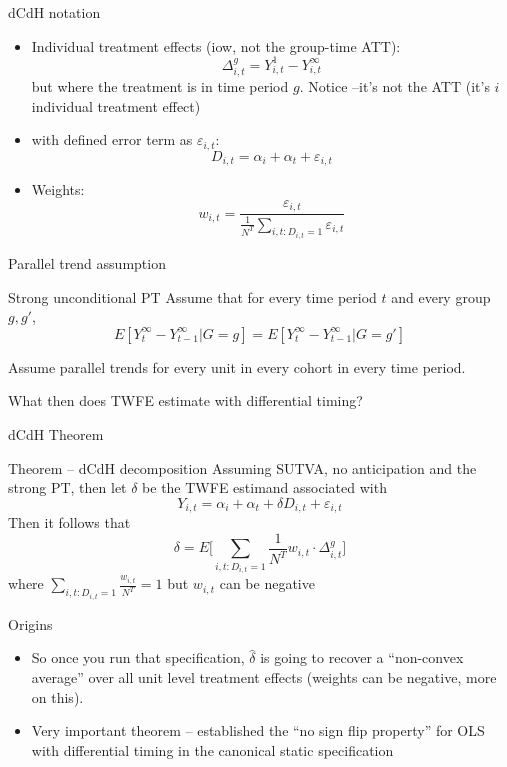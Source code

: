 \documentclass{beamer}
\begin{document}
\begin{frame}{dCdH notation}

\begin{itemize}
\item Individual treatment effects (iow, not the group-time ATT): $$\Delta^g_{i,t} = Y^1_{i,t} - Y^\infty_{i,t}$$ but where the treatment is in time period $g$. Notice --it's not the ATT (it's $i$ individual treatment effect)
\item with defined error term as $\varepsilon_{i,t}$: $$D_{i,t} = \alpha_i + \alpha_t + \varepsilon_{i,t}$$
\item Weights: $$w_{i,t} = \frac{\varepsilon_{i,t}}{\frac{1}{N^T} \sum_{i,t:D_{i,t}=1} \varepsilon_{i,t}}$$
\end{itemize}

\end{frame}

\begin{frame}{Parallel trend assumption}

\begin{block}{Strong unconditional PT}
Assume that for every time period $t$ and every group $g,g'$, $$E[Y^\infty_t - Y^\infty_{t-1}|G=g] = E[Y^\infty_t - Y^\infty_{t-1}|G=g'] $$
\end{block}Assume parallel trends for every unit in every cohort in every time period.

\bigskip

What then does TWFE estimate with differential timing?

\end{frame}

\begin{frame}{dCdH Theorem}

\begin{block}{Theorem -- dCdH decomposition}
Assuming SUTVA, no anticipation and the strong PT, then let $\delta$ be the TWFE estimand associated with $$Y_{i,t} = \alpha_i + \alpha_t + \delta D_{i,t} + \varepsilon_{i,t}$$Then it follows that $$\delta = E \bigg [ \sum_{i,t:D_{i,t}=1} \frac{1}{N^T} w_{i,t} \cdot \Delta_{i,t}^g \bigg ] $$ where $\sum_{i,t:D_{i,t}=1} \frac{w_{i,t}}{N^T} = 1$ but $w_{i,t}$ can be negative
\end{block}

\end{frame}

\begin{frame}{Origins}

\begin{itemize}
\item So once you run that specification, $\widehat{\delta}$ is going to recover a ``non-convex average'' over all unit level treatment effects (weights can be negative, more on this). 
\item Very important theorem -- established the ``no sign flip property'' for OLS with differential timing in the canonical static specification
\end{itemize}

\end{frame}
\end{document}
